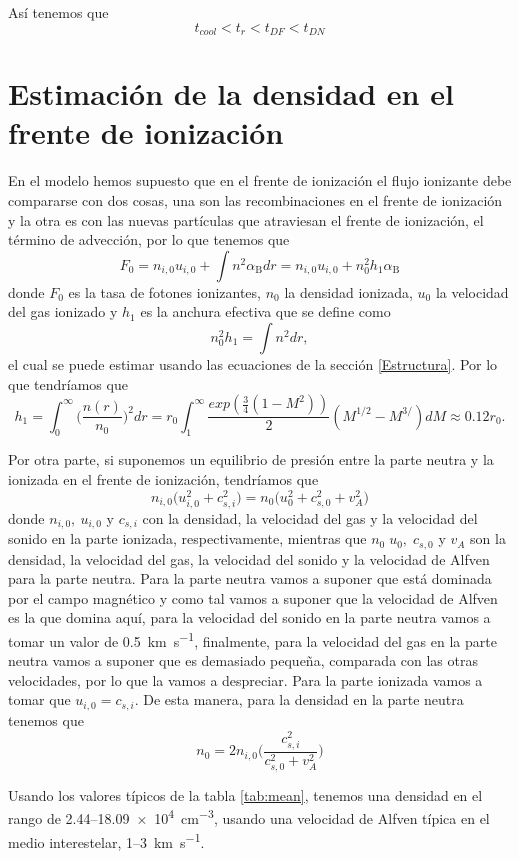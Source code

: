 \documentclass{book}
\begin{document}
Así tenemos que
\[t_{cool}<t_r<t_{DF}<t_{DN}\]

\chapter{Estimación de la densidad en el frente de ionización }\label{App : tasa de fotoionizacion}

En el modelo hemos supuesto que en el frente de ionización el flujo ionizante debe compararse con dos cosas, una son las recombinaciones en el frente de ionización y la otra es con las nuevas partículas que atraviesan el frente de ionización, el término de advección, por lo que tenemos que 
\[F_0 = n_{i,0} u_{i,0} +\int n^2\alpha_\mathrm{B}dr = n_{i,0}u_{i,0}+n_0^2h_1\alpha_\mathrm{B}\] donde $F_0$ es la tasa de fotones ionizantes, $n_0$ la densidad ionizada, $u_0$ la velocidad del gas ionizado y $h_1$ es la anchura efectiva que se define como
\[n_0^2h_1=\int n^2dr,\] el cual se puede estimar usando las ecuaciones de la sección \ref{Estructura}. Por lo que tendríamos que 
\[h_1=\int_0^\infty \Big(\frac{n(r)}{n_0}\Big)^2dr=r_0\int_1^\infty\frac{exp(\frac{3}{4}(1-M^2))}{2}(M^{1/2}-M^{3/})dM\approx0.12r_0.\]

Por otra parte, si suponemos un equilibrio de presión entre la parte neutra y la ionizada  en el frente de ionización, tendríamos que \[n_{i,0}\big(u_{i,0}^2+c_{s,i}^2\big) = n_0\big(u_0^2+c_{s,0}^2+v_A^2\big)\] donde $n_{i,0},\:u_{i,0}$ y $c_{s,i}$ con la densidad, la velocidad del gas y la velocidad del sonido en la parte ionizada, respectivamente, mientras que $n_0\;u_0,\;c_{s,0}$ y $v_A$ son la densidad, la velocidad del gas, la velocidad del sonido y la velocidad de Alfven para la parte neutra. Para la parte neutra vamos a suponer que está dominada por el campo magnético y como tal vamos a suponer que la velocidad de Alfven es la que domina aquí, para la velocidad del sonido en la parte neutra vamos a tomar un valor de \SI{0.5}{km .s^{-1}}, finalmente, para la velocidad del gas en la parte neutra vamos a suponer que es demasiado pequeña, comparada con las otras velocidades, por lo que la vamos a despreciar. Para la parte ionizada vamos a tomar que $u_{i,0}=c_{s,i}$. De esta manera, para la densidad en la parte neutra tenemos que 
\[n_0 = 2n_{i,0}\Big(\frac{c_{s,i}^2}{c_{s,0}^2+v_A^2}\Big)\]

Usando los valores típicos de la tabla \ref{tab:mean}, tenemos una densidad en el rango de 2.44--\SI{18.09e4}{cm^{-3}}, usando una velocidad de Alfven típica en el medio interestelar, 1--\SI{3}{km.s^{-1}}.
\end{document}
